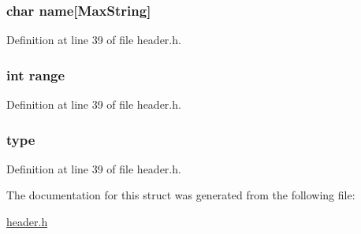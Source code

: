 \hypertarget{structt__skill_ab27f28c5ead39031421706ddbbd1edea}{
\subsubsection[{name}]{\setlength{\rightskip}{0pt plus 5cm}char name\mbox{[}{\bf Max\-String}\mbox{]}}}\label{structt__skill_ab27f28c5ead39031421706ddbbd1edea}


Definition at line 39 of file header.\-h.

\hypertarget{structt__skill_a037e8e370380046bec287bdc96942091}{
\subsubsection[{range}]{\setlength{\rightskip}{0pt plus 5cm}int range}}\label{structt__skill_a037e8e370380046bec287bdc96942091}


Definition at line 39 of file header.\-h.

\hypertarget{structt__skill_ac00edc3c188c78c47878a357ecff2954}{
\subsubsection[{type}]{ type}}\label{structt__skill_ac00edc3c188c78c47878a357ecff2954}


Definition at line 39 of file header.\-h.



The documentation for this struct was generated from the following file\-:\begin{DoxyCompactItemize}
\item 
\hyperlink{header_8h}{header.\-h}\end{DoxyCompactItemize}
